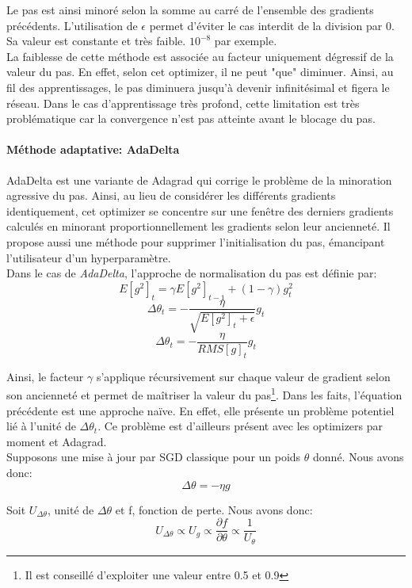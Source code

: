 \noindent Le pas est ainsi minoré selon la somme au carré de l'ensemble des gradients précédents. L'utilisation de $\epsilon$ permet d'éviter le cas interdit de la division par 0. Sa valeur est constante et très faible. $10^{-8}$ par exemple.\\

\noindent La faiblesse de cette méthode est associée au facteur uniquement dégressif de la valeur du pas. En effet, selon cet optimizer, il ne peut "que" diminuer. Ainsi, au fil des apprentissages, le pas diminuera jusqu'à devenir infinitésimal et figera le réseau. Dans le cas d'apprentissage très profond, cette limitation est très problématique car la convergence n'est pas atteinte avant le blocage du pas.

\paragraph{Méthode adaptative: AdaDelta}
\noindent AdaDelta\cite{adadelta} est une variante de Adagrad qui corrige le problème de la minoration agressive du pas. Ainsi, au lieu de considérer les différents gradients identiquement, cet optimizer se concentre sur une fenêtre des derniers gradients calculés en minorant proportionnellement les gradients selon leur ancienneté. Il propose aussi une méthode pour supprimer l'initialisation du pas, émancipant l'utilisateur d'un hyperparamètre.\\

\noindent Dans le cas de \textit{AdaDelta}, l'approche de normalisation du pas est définie par:
$$E[g^2]_t = \gamma E[g^2]_{t-1} + (1 - \gamma) g^2_t$$
$$\Delta \theta_t = - \dfrac{\eta}{\sqrt{E[g^2]_t + \epsilon}} g_{t}$$
$$\Delta \theta_t = - \dfrac{\eta}{RMS[g]_{t}} g_t$$

\noindent Ainsi, le facteur $\gamma$ s'applique récursivement sur chaque valeur de gradient selon son ancienneté et permet de maîtriser la valeur du pas\footnote{Il est conseillé d'exploiter une valeur entre 0.5 et 0.9}. Dans les faits, l'équation précédente est une approche naïve. En effet, elle présente un problème potentiel lié à l'unité de $\Delta \theta_t$. Ce problème est d'ailleurs présent avec les optimizers par moment et Adagrad.\\

\noindent Supposons une mise à jour par SGD classique pour un poids $\theta$ donné. Nous avons donc:
$$\Delta \theta = - \eta g$$

\noindent Soit $U_{\Delta \theta}$, unité de $\Delta \theta$ et f, fonction de perte. Nous avons donc:
$$U_{\Delta \theta} \propto U_{g} \propto \frac{\partial f}{\partial \theta} \propto \frac{1}{U_\theta}$$

